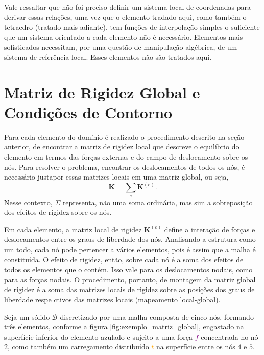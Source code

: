 Vale ressaltar que não foi preciso definir um sistema local de coordenadas para derivar essas relações, uma vez que o elemento tradado aqui, como também o tetraedro (tratado mais adiante), tem funções de interpolação simples o suficiente que um sistema orientado a cada elemento não é necessário. Elementos mais sofisticados necessitam, por uma questão de manipulação algébrica, de um sistema de referência local. Esses elementos não são tratados aqui.

\section{Matriz de Rigidez Global e Condições de Contorno}

Para cada elemento do domínio é realizado o procedimento descrito na seção anterior, de encontrar a matriz de rigidez local que descreve o equilíbrio do elemento em termos das forças externas e do campo de deslocamento sobre os nós. Para resolver o problema, encontrar os deslocamentos de todos os nós, é necessário justapor essas matrizes locais em uma matriz global, ou seja,
\begin{equation}
    \bm{K} = \sum_{e} \bm{K}^{(e)}.
\end{equation}
Nesse contexto, $\Sigma$ representa, não uma soma ordinária, mas sim a sobreposição dos efeitos de rigidez sobre os nós. \cite{LOGAN}

Em cada elemento, a matriz local de rigidez $\bm{K}^{(e)}$ define a interação de forças e deslocamentos entre os graus de liberdade dos nós. Analisando a estrutura como um todo, cada nó pode pertencer a vários elementos, pois é assim que a malha é constituída. O efeito de rigidez, então, sobre cada nó é a soma dos efeitos de todos os elementos que o contém. Isso vale para os deslocamentos nodais, como para as forças nodais. O procedimento, portanto, de montagem da matriz global de rigidez é a soma das matrizes locais de rigidez sobre as posições dos graus de liberdade respe    ctivos das matrizes locais (mapeamento local-global).

Seja um sólido $\mathcal{B}$ discretizado por uma malha composta de cinco nós, formando três elementos, conforme a figura \ref{fig:exemplo_matriz_global}, engastado na superfície inferior do elemento azulado e sujeito a uma força \textcolor{purple}{$f$} concentrada no nó $2$, como também um carregamento distribuído \textcolor{orange}{$t$} na superfície entre os nós $4$ e $5$.





